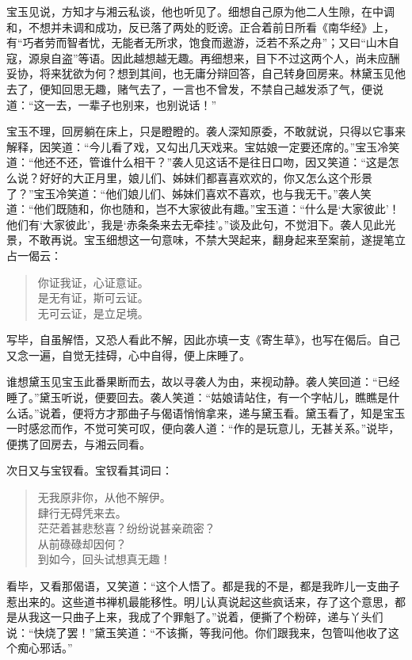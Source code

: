\documentclass[12pt,oneside]{book}
\newenvironment{shici}{%
\begin{verse}%
\centering\large\hspace{12pt}}%
{\end{verse}}
\begin{document}
宝玉见说，方知才与湘云私谈，他也听见了。细想自己原为他二人生隙，在中调和，不想并未调和成功，反已落了两处的贬谤。正合着前日所看《南华经》上，有“巧者劳而智者忧，无能者无所求，饱食而遨游，泛若不系之舟”；又曰“山木自寇，源泉自盗”等语。因此越想越无趣。再细想来，目下不过这两个人，尚未应酬妥协，将来犹欲为何？想到其间，也无庸分辩回答，自己转身回房来。林黛玉见他去了，便知回思无趣，赌气去了，一言也不曾发，不禁自己越发添了气，便说道：“这一去，一辈子也别来，也别说话！”

宝玉不理，回房躺在床上，只是瞪瞪的。袭人深知原委，不敢就说，只得以它事来解释，因笑道：“今儿看了戏，又勾出几天戏来。宝姑娘一定要还席的。”宝玉冷笑道：“他还不还，管谁什么相干？”袭人见这话不是往日口吻，因又笑道：“这是怎么说？好好的大正月里，娘儿们、姊妹们都喜喜欢欢的，你又怎么这个形景了？”宝玉冷笑道：“他们娘儿们、姊妹们喜欢不喜欢，也与我无干。”袭人笑道：“他们既随和，你也随和，岂不大家彼此有趣。”宝玉道：“什么是‘大家彼此’！他们有‘大家彼此’，我是‘赤条条来去无牵挂’。”谈及此句，不觉泪下。袭人见此光景，不敢再说。宝玉细想这一句意味，不禁大哭起来，翻身起来至案前，遂提笔立占一偈云：

\begin{shici}
你证我证，心证意证。\\
是无有证，斯可云证。\\
无可云证，是立足境。
\end{shici}

写毕，自虽解悟，又恐人看此不解，因此亦填一支《寄生草》，也写在偈后。自己又念一遍，自觉无挂碍，心中自得，便上床睡了。

谁想黛玉见宝玉此番果断而去，故以寻袭人为由，来视动静。袭人笑回道：“已经睡了。”黛玉听说，便要回去。袭人笑道：“姑娘请站住，有一个字帖儿，瞧瞧是什么话。”说着，便将方才那曲子与偈语悄悄拿来，递与黛玉看。黛玉看了，知是宝玉一时感忿而作，不觉可笑可叹，便向袭人道：“作的是玩意儿，无甚关系。”说毕，便携了回房去，与湘云同看。

次日又与宝钗看。宝钗看其词曰：

\begin{shici}
无我原非你，从他不解伊。\\
肆行无碍凭来去。\\
茫茫着甚悲愁喜？纷纷说甚亲疏密？\\
从前碌碌却因何？\\
到如今，回头试想真无趣！
\end{shici}

看毕，又看那偈语，又笑道：“这个人悟了。都是我的不是，都是我昨儿一支曲子惹出来的。这些道书禅机最能移性。明儿认真说起这些疯话来，存了这个意思，都是从我这一只曲子上来，我成了个罪魁了。”说着，便撕了个粉碎，递与丫头们说：“快烧了罢！”黛玉笑道：“不该撕，等我问他。你们跟我来，包管叫他收了这个痴心邪话。”
\end{document}
